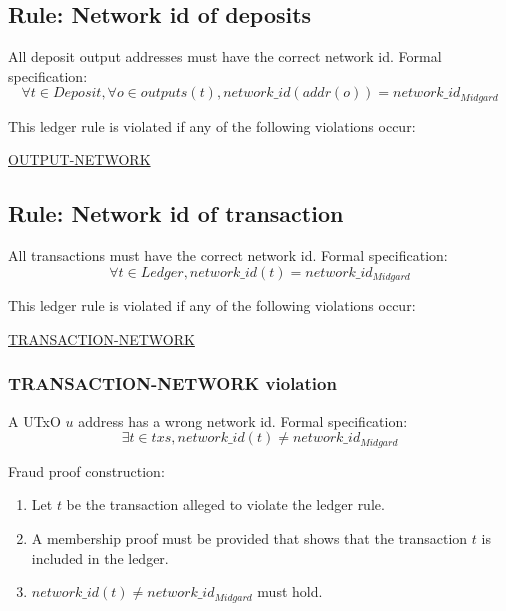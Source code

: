 \documentclass[../midgard.tex]{subfiles}
\begin{document}
\subsection{Rule: Network id of deposits}
\label{rule:network-id-of-deposits}
All deposit output addresses must have the correct network id.
Formal specification:
\begin{equation*}
    \forall t \in Deposit, \forall o \in outputs(t), network\_id(addr(o)) = network\_id_{Midgard}
\end{equation*}

This ledger rule is violated if any of the following violations occur:
\begin{itemize-multi}
  \item \hyperref[violation:OUTPUT-NETWORK]{OUTPUT-NETWORK}
\end{itemize-multi}

\subsection{Rule: Network id of transaction}
\label{rule:network-id-of-transaction}
All transactions must have the correct network id.
Formal specification:
\begin{equation*}
    \forall t \in Ledger, network\_id(t) = network\_id_{Midgard}
\end{equation*}

This ledger rule is violated if any of the following violations occur:
\begin{itemize-multi}
  \item \hyperref[violation:TRANSACTION-NETWORK]{TRANSACTION-NETWORK}
\end{itemize-multi}

\subsubsection{TRANSACTION-NETWORK violation}
\label{violation:TRANSACTION-NETWORK}
A UTxO $u$ address has a wrong network id.
Formal specification:
\begin{equation*}
  \exists t \in txs, network\_id(t) \neq network\_id_{Midgard}
\end{equation*}

Fraud proof construction:
\begin{enumerate}
  \item Let $t$ be the transaction alleged to violate the ledger rule.
  \item A membership proof must be provided that shows that the transaction $t$ is included in the ledger.
  \item $network\_id(t) \neq network\_id_{Midgard}$ must hold.
\end{enumerate}
\end{document}
